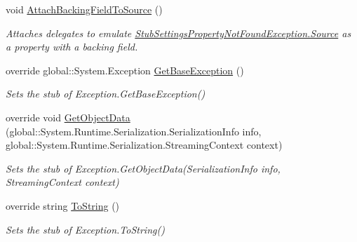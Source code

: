 \begin{DoxyCompactItemize}
void \hyperlink{class_system_1_1_configuration_1_1_fakes_1_1_stub_settings_property_not_found_exception_ad27dcb5df78403f40646134b355890f9}{Attach\-Backing\-Field\-To\-Source} ()
\begin{DoxyCompactList}\small\item\em Attaches delegates to emulate \hyperlink{class_system_1_1_configuration_1_1_fakes_1_1_stub_settings_property_not_found_exception_ad8ea4aa21668c5cca32e55d8e38cc423}{Stub\-Settings\-Property\-Not\-Found\-Exception.\-Source} as a property with a backing field.\end{DoxyCompactList}\item 
override global\-::\-System.\-Exception \hyperlink{class_system_1_1_configuration_1_1_fakes_1_1_stub_settings_property_not_found_exception_a5a580e4b92bdee29dc90e73780856257}{Get\-Base\-Exception} ()
\begin{DoxyCompactList}\small\item\em Sets the stub of Exception.\-Get\-Base\-Exception()\end{DoxyCompactList}\item 
override void \hyperlink{class_system_1_1_configuration_1_1_fakes_1_1_stub_settings_property_not_found_exception_ae8503c58878fe4134a283d862beeb81d}{Get\-Object\-Data} (global\-::\-System.\-Runtime.\-Serialization.\-Serialization\-Info info, global\-::\-System.\-Runtime.\-Serialization.\-Streaming\-Context context)
\begin{DoxyCompactList}\small\item\em Sets the stub of Exception.\-Get\-Object\-Data(\-Serialization\-Info info, Streaming\-Context context)\end{DoxyCompactList}\item 
override string \hyperlink{class_system_1_1_configuration_1_1_fakes_1_1_stub_settings_property_not_found_exception_ac9713d03398528fbf81a179f57e5746b}{To\-String} ()
\begin{DoxyCompactList}\small\item\em Sets the stub of Exception.\-To\-String()\end{DoxyCompactList}\end{DoxyCompactItemize}
